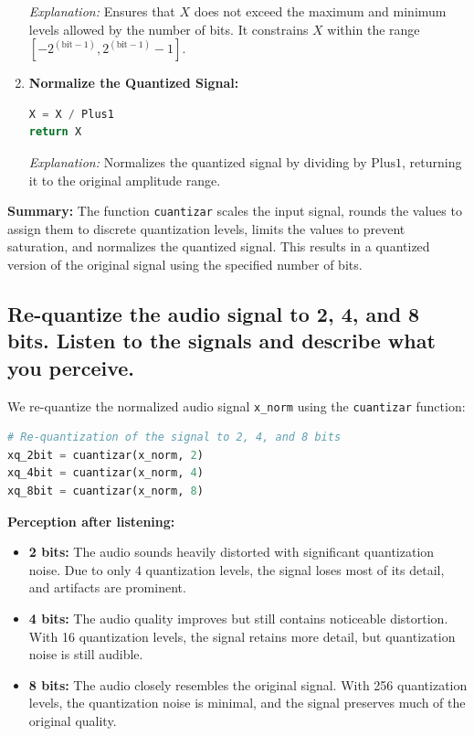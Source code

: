 \documentclass[10pt]{article}
\theoremstyle{definition}
\theoremstyle{remark}
\theoremstyle{definition}
\numberwithin{equation}{prob}
\begin{document}
\begin{enumerate}
    \textit{Explanation:} Ensures that \( X \) does not exceed the maximum and minimum levels allowed by the number of bits. It constrains \( X \) within the range \([ -2^{(\text{bit} - 1)}, 2^{(\text{bit} - 1)} - 1 ]\).

    \item \textbf{Normalize the Quantized Signal:}

    \begin{lstlisting}[language=Python]
X = X / Plus1
return X
    \end{lstlisting}

    \textit{Explanation:} Normalizes the quantized signal by dividing by \( \text{Plus1} \), returning it to the original amplitude range.
\end{enumerate}

\textbf{Summary:} The function \texttt{cuantizar} scales the input signal, rounds the values to assign them to discrete quantization levels, limits the values to prevent saturation, and normalizes the quantized signal. This results in a quantized version of the original signal using the specified number of bits.

\subsection{Re-quantize the audio signal to 2, 4, and 8 bits. Listen to the signals and describe what you perceive.}

We re-quantize the normalized audio signal \texttt{x\_norm} using the \texttt{cuantizar} function:

\begin{lstlisting}[language=Python]
# Re-quantization of the signal to 2, 4, and 8 bits
xq_2bit = cuantizar(x_norm, 2)
xq_4bit = cuantizar(x_norm, 4)
xq_8bit = cuantizar(x_norm, 8)
\end{lstlisting}

\textbf{Perception after listening:}

\begin{itemize}
    \item \textbf{2 bits:} The audio sounds heavily distorted with significant quantization noise. Due to only 4 quantization levels, the signal loses most of its detail, and artifacts are prominent.
    \item \textbf{4 bits:} The audio quality improves but still contains noticeable distortion. With 16 quantization levels, the signal retains more detail, but quantization noise is still audible.
    \item \textbf{8 bits:} The audio closely resembles the original signal. With 256 quantization levels, the quantization noise is minimal, and the signal preserves much of the original quality.
\end{itemize}
\end{document}
